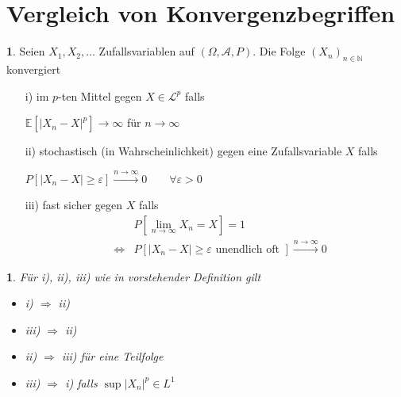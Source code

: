 \documentclass[10pt,a4paper]{report}
\newcommand{\E}{\mathbb{E}}
\newcommand{\N}{\mathbb{N}}
\numberwithin{equation}{section}
\numberwithin{figure}{section}
\theoremstyle{plain}
\theoremstyle{definition}
\newtheorem{defn}[thm]{\protect\definitionname}
\theoremstyle{remark}
\theoremstyle{plain}
\newtheorem{prop}[thm]{\protect\propositionname}
\providecommand{\definitionname}{Definition}
\providecommand{\propositionname}{Satz}
\newcommand{\1}{ \mathbb{1} } %
\begin{document}
\section{Vergleich von Konvergenzbegriffen}
\label{sec:konvergenz}
\begin{defn}   %
  Seien $X_1,X_2,\ldots$ Zufallsvariablen auf $(\Omega,\mathcal{A},P)$. Die Folge
  $(X_n)_{n \in \N}$ konvergiert
  \begin{itemize}
  \item[i)] im $p$-ten Mittel gegen $X \in \mathcal{L}^p$ falls
    \begin{center}
      $\E[|X_n-X|^p] \to \infty$ für $n \to \infty$
    \end{center}
  \item[ii)] stochastisch (in Wahrscheinlichkeit) gegen eine Zufallsvariable $X$
    falls
    \begin{center}
      $P[|X_n-X|\geq \varepsilon ] \overset{n \to \infty}{\to} 0\qquad
      \forall \varepsilon >0$
    \end{center}
  \item[iii)] fast sicher gegen $X$ falls
    \begin{eqnarray*}
      && P\left[\lim\limits_{n \to \infty}X_n=X \right]=1\\
      &\Leftrightarrow &P[|X_n-X|\geq \varepsilon \text{ unendlich oft }] \overset{n \to \infty}{\to} 0
    \end{eqnarray*}
  \end{itemize}
\end{defn}
\begin{prop} %
  Für i), ii), iii) wie in vorstehender Definition gilt
  \begin{itemize}
  \item i) $\Rightarrow$ ii)
  \item iii) $\Rightarrow$ ii)
  \item ii) $\Rightarrow$ iii) für eine Teilfolge
  \item iii) $\Rightarrow$ i) falls $\sup|X_n|^p \in L^1$
  \end{itemize}
\end{prop}
\end{document}
